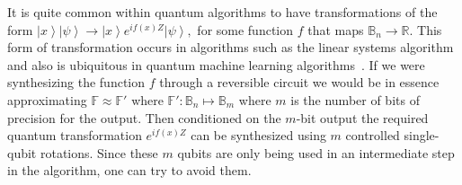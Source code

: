 \documentclass[conference]{IEEEtran}
\newcommand{\fig}[1]{\hyperref[fig:#1]{Figure~\ref*{fig:#1}}}
\newcommand{\openone}{1\!\!1}
\newcommand{\ket}[1]{\left| #1\right\rangle}        %
\newcommand{\nix}[1]{{}}
\begin{document}
\nix{
\begin{table}[t!]
\tiny
\[
\begin{tabular}{c@{\qquad}c@{\qquad}c@{\qquad}c}
\hline\\
Circuit & Function & Success probability& Correction circuit\\[1.5ex]
\hline\\
$e^{-i\phi_1 X} e^{-i\phi_2X}$ & $\phi_1+\phi_2$ & $100\%$& --\\[1.5ex]
${\rm PAR}(\phi_1,\ldots,\phi_k)$ & $\prod_{i=1}^k \phi_i + O(\max_i |\phi_i|^{k+2})$&
$\frac{1}{2}\left(\prod_{i=1}^k \cos(\phi_i)^2 + \prod_{i=1}^k \sin(\phi_i)^2\right)$ & $\openone\text{ or } 2{\rm PAR}(\phi_1,\ldots,\phi_k)$\\[1.5ex]
${\rm GB}(\phi_1,\ldots,\phi_k)$ & $\prod_{i=1}^k \phi^2_i + O(\max_i |\phi_i|^{2k+2})$&
$\left(1-\prod_{i=1}^k \sin^2(\phi_i)\right)^2 + \prod_{i=1}^k \sin^4(\phi_i)$ &
$e^{-i\pi/4 X}$ (Clifford)\\[1ex]
\hline
\end{tabular}
\]
\caption{Effective transformations carried out by the circuits in \fig{circuit} for small input rotations.\label{tab:succprob}}
\end{table}
}

It is quite common within quantum algorithms to have transformations
of the form 
$\ket{x}\ket{\psi} \rightarrow \ket{x}e^{if(x)Z}\ket{\psi},$
for some function $f$ that maps $\mathbb{B}_{n} \rightarrow \mathbb{R}$.  This form of transformation occurs in algorithms such as the linear systems algorithm~\cite{harrow2009quantum} and also is ubiquitous in quantum machine learning algorithms~\cite{lloyd2016quantum,wiebe2016quantum}.  If we were synthesizing the function $f$  through a reversible circuit we would be in essence approximating $\mathbb{F} \approx \mathbb{F}'$ where $\mathbb{F}' : \mathbb{B}_n \mapsto \mathbb{B}_m$ where $m$ is the number of bits of precision for the output.  Then conditioned on the $m$-bit output the required quantum transformation $e^{i f(x)Z}$ can be synthesized using $m$ controlled single-qubit rotations.  Since these $m$ qubits are only being used in an intermediate step in the algorithm, one can try to avoid them.  
\end{document}
